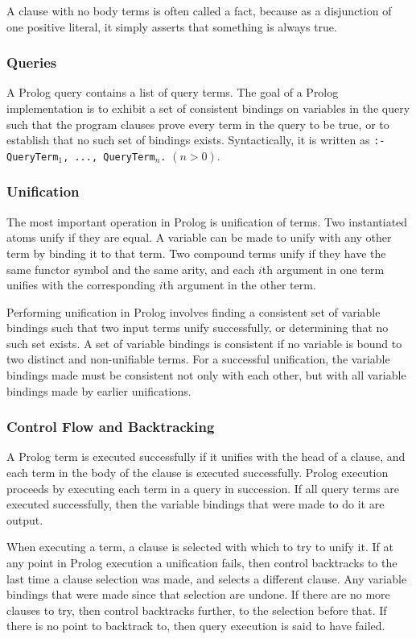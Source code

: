 \documentclass[12pt]{article}
\begin{document}
A clause with no body terms is often called a fact, because as a disjunction of one positive literal, it simply asserts that something is always true.

\subsubsection{Queries}

A Prolog query contains a list of query terms. 
The goal of a Prolog implementation is to exhibit a set of consistent bindings on variables in the query such that the program clauses prove every term in the query to be true, or to establish that no such set of bindings exists. 
Syntactically, it is written as \verb|:- QueryTerm|$_1$\verb|, ..., QueryTerm|$_n$\verb|.| $(n > 0)$.

\subsubsection{Unification}

The most important operation in Prolog is unification of terms. 
Two instantiated atoms unify if they are equal. 
A variable can be made to unify with any other term by binding it to that term. 
Two compound terms unify if they have the same functor symbol and the same arity, and each $i$th argument in one term unifies with the corresponding $i$th argument in the other term. 

Performing unification in Prolog involves finding a consistent set of variable bindings such that two input terms unify successfully, or determining that no such set exists. 
A set of variable bindings is consistent if no variable is bound to two distinct and non-unifiable terms. 
For a successful unification, the variable bindings made must be consistent not only with each other, but with all variable bindings made by earlier unifications.

\subsubsection{Control Flow and Backtracking}

A Prolog term is executed successfully if it unifies with the head of a clause, and each term in the body of the clause is executed successfully.
Prolog execution proceeds by executing each term in a query in succession. 
If all query terms are executed successfully, then the variable bindings that were made to do it are output.

When executing a term, a clause is selected with which to try to unify it.
If at any point in Prolog execution a unification fails, then control backtracks to the last time a clause selection was made, and selects a different clause.
Any variable bindings that were made since that selection are undone.
If there are no more clauses to try, then control backtracks further, to the selection before that.
If there is no point to backtrack to, then query execution is said to have failed.
\end{document}
